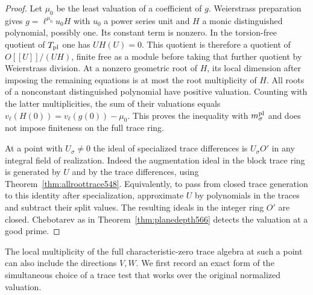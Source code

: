 \documentclass[a4paper,11pt]{article}
\theoremstyle{definition}
\theoremstyle{remark}
\numberwithin{equation}{section}
\begin{document}
\begin{proof}
Let \(\mu_0\) be the least valuation of a coefficient of \(g\).
Weierstrass preparation gives
\(g=\ell^{\mu_0}u_0 H\) with \(u_0\) a power series unit
and \(H\) a monic distinguished polynomial, possibly one.
Its constant term is nonzero. In the torsion-free quotient
of \(T_{\rm pl}\) one has \(U H(U)=0\). This quotient is
therefore a quotient of \(O[[U]]/(UH)\), finite free as a
module before taking that further quotient by Weierstrass
division. At a nonzero geometric root of \(H\), its local
dimension after imposing the remaining equations is at most
the root multiplicity of \(H\). All roots of a nonconstant
distinguished polynomial have positive valuation. Counting
with the latter multiplicities, the sum of their valuations
equals \(v_\ell(H(0))=v_\ell(g(0))-\mu_0\). This proves
the inequality with \(m_\sigma^{\rm pl}\) and does not impose
finiteness on the full trace ring.

At a point with \(U_\sigma\ne0\) the ideal of specialized
trace differences is \(U_\sigma O'\) in any integral field
of realization. Indeed the augmentation ideal in the block
trace ring is generated by \(U\) and by the trace differences,
using Theorem~\ref{thm:allroottrace548}. Equivalently, to
pass from closed trace generation to this identity after
specialization, approximate \(U\) by polynomials in the
traces and subtract their split values. The resulting ideals
in the integer ring \(O'\) are closed. Chebotarev as in
Theorem~\ref{thm:planedepth566} detects the valuation at a
good prime.
\end{proof}

The local multiplicity of the full characteristic-zero trace
algebra at such a point can also include the directions \(V,W\).
We first record an exact form of the simultaneous choice of a
trace test that works over the original normalized valuation.
\end{document}
